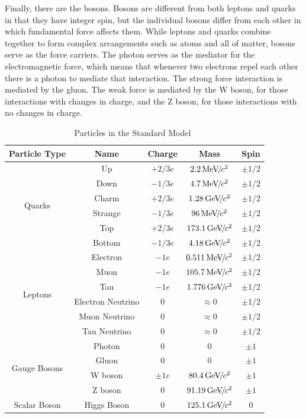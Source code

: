 Finally, there are the bosons. Bosons are different from both leptons and quarks in that they have integer spin, but the individual bosons differ from each other in which fundamental force affects them. While leptons and quarks combine together to form complex arrangements such as atoms and all of matter, bosons serve as the force carriers. The photon serves as the mediator for the electromagnetic force, which means that whenever two electrons repel each other there is a photon to mediate that interaction. The strong force interaction is mediated by the gluon. The weak force is mediated by the W boson, for those interactions with changes in charge, and the Z boson, for those interactions with no changes in charge. 

\begin{table}
\caption{Particles in the Standard Model~\cite{pdg}}
\label{tab:particles}
\begin{center}
\begin{tabular}{|c|c|c|c|c|}
\hline
Particle Type & Name & Charge & Mass & Spin \\
\hline
\multirow{6}{*}{Quarks} & Up & $+2/3e$ & $2.2{\,\text{Me\hspace{-.08em}V\hspace{-0.16em}/\hspace{-0.08em}}c^\text{2}}$ & $\pm 1/2$ \\
& Down & $-1/3e$ & $4.7{\,\text{Me\hspace{-.08em}V\hspace{-0.16em}/\hspace{-0.08em}}c^\text{2}}$ & $\pm 1/2$ \\
& Charm & $+2/3e$ & $1.28{\,\text{Ge\hspace{-.08em}V\hspace{-0.16em}/\hspace{-0.08em}}c^\text{2}}$ & $\pm 1/2$ \\
& Strange & $-1/3e$ & $96{\,\text{Me\hspace{-.08em}V\hspace{-0.16em}/\hspace{-0.08em}}c^\text{2}}$ & $\pm 1/2$ \\
& Top & $+2/3e$ & $173.1{\,\text{Ge\hspace{-.08em}V\hspace{-0.16em}/\hspace{-0.08em}}c^\text{2}}$ & $\pm 1/2$ \\
& Bottom & $-1/3e$ & $4.18{\,\text{Ge\hspace{-.08em}V\hspace{-0.16em}/\hspace{-0.08em}}c^\text{2}}$ & $\pm 1/2$ \\
\hline
\multirow{6}{*}{Leptons} & Electron & $-1e$ & $0.511{\,\text{Me\hspace{-.08em}V\hspace{-0.16em}/\hspace{-0.08em}}c^\text{2}}$ & $\pm 1/2$ \\
& Muon & $-1e$ & $105.7{\,\text{Me\hspace{-.08em}V\hspace{-0.16em}/\hspace{-0.08em}}c^\text{2}}$ & $\pm 1/2$ \\
& Tau & $-1e$ & $1.776{\,\text{Ge\hspace{-.08em}V\hspace{-0.16em}/\hspace{-0.08em}}c^\text{2}}$ & $\pm 1/2$ \\
& Electron Neutrino & $0$ & $\approx 0$ & $\pm 1/2$ \\
& Muon Neutrino & $0$ & $\approx 0$ & $\pm 1/2$ \\
& Tau Neutrino & $0$ & $\approx 0$ & $\pm 1/2$ \\
\hline
\multirow{4}{*}{Gauge Bosons} & Photon & 0 & 0 & $\pm 1$ \\
& Gluon & 0 & 0 & $\pm 1$ \\
& W boson & $\pm 1e$ & $80.4{\,\text{Ge\hspace{-.08em}V\hspace{-0.16em}/\hspace{-0.08em}}c^\text{2}}$ & $\pm 1$ \\
& Z boson & 0 & $91.19{\,\text{Ge\hspace{-.08em}V\hspace{-0.16em}/\hspace{-0.08em}}c^\text{2}}$ & $\pm 1$ \\
\hline
Scalar Boson & Higgs Boson & 0 & $125.1{\,\text{Ge\hspace{-.08em}V\hspace{-0.16em}/\hspace{-0.08em}}c^\text{2}}$ & 0 \\
\hline
\end{tabular}
\end{center}
\end{table} 
